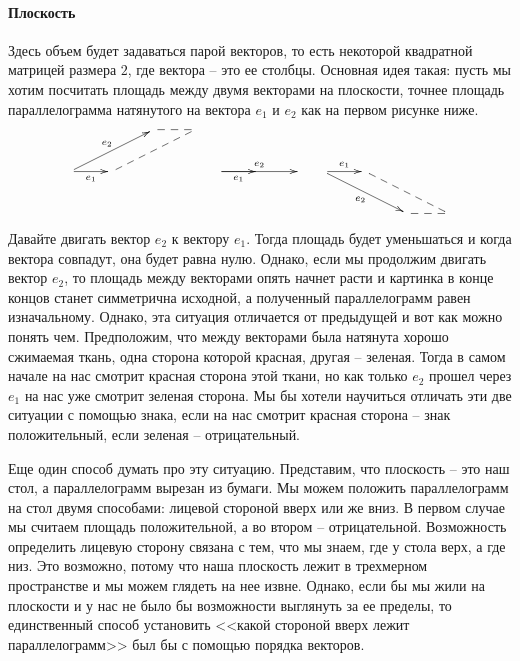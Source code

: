 \paragraph{Плоскость}

Здесь объем будет задаваться парой векторов, то есть некоторой квадратной матрицей размера $2$, где вектора -- это ее столбцы.
Основная идея такая: пусть мы хотим посчитать площадь между двумя векторами на плоскости, точнее площадь параллелограмма натянутого на вектора $e_1$ и $e_2$ как на первом рисунке ниже.
\[
\xymatrix{
	{}&{}&{}\ar@{--}[r]&{}\\
	{}\ar[urr]^{e_2}\ar[r]_{e_1}&{}\ar@{--}[urr]&{}&{}\\
	{}&{}&{}&{}\\
}\quad
\xymatrix{
	{}&{}&{}\\
	{}\ar[rr]^{e_2}\ar[r]_{e_1}&{}&{}\\
	{}&{}&{}\\
}\quad
\xymatrix{
	{}&{}&{}&{}\\
	{}\ar[drr]_{e_2}\ar[r]^{e_1}&{}\ar@{--}[drr]&{}&{}\\
	{}&{}&{}\ar@{--}[r]&{}\\
}
\]
Давайте двигать вектор $e_2$ к вектору $e_1$.
Тогда площадь будет уменьшаться и когда вектора совпадут, она будет равна нулю.
Однако, если мы продолжим двигать вектор $e_2$, то площадь между векторами опять начнет расти и картинка в конце концов станет симметрична исходной, а полученный параллелограмм равен изначальному.
Однако, эта ситуация отличается от предыдущей и вот как можно понять чем.
Предположим, что между векторами была натянута хорошо сжимаемая ткань, одна сторона которой красная, другая -- зеленая.
Тогда в самом начале на нас смотрит красная сторона этой ткани, но как только $e_2$ прошел через $e_1$ на нас уже смотрит зеленая сторона.
Мы бы хотели научиться отличать эти две ситуации с помощью знака, если на  нас смотрит красная сторона -- знак положительный, если зеленая -- отрицательный.

Еще один способ думать про эту ситуацию.
Представим, что плоскость -- это наш стол, а параллелограмм вырезан из бумаги.
Мы можем положить параллелограмм на стол двумя способами: лицевой стороной вверх или же вниз.
В первом случае мы считаем площадь положительной, а во втором -- отрицательной.
Возможность определить лицевую сторону связана с тем, что мы знаем, где у стола верх, а где низ.
Это возможно, потому что наша плоскость лежит в трехмерном пространстве и мы можем глядеть на нее извне.
Однако, если бы мы жили на плоскости и у нас не было бы возможности выглянуть за ее пределы, то единственный способ установить <<какой стороной вверх лежит параллелограмм>> был бы с помощью порядка векторов.

